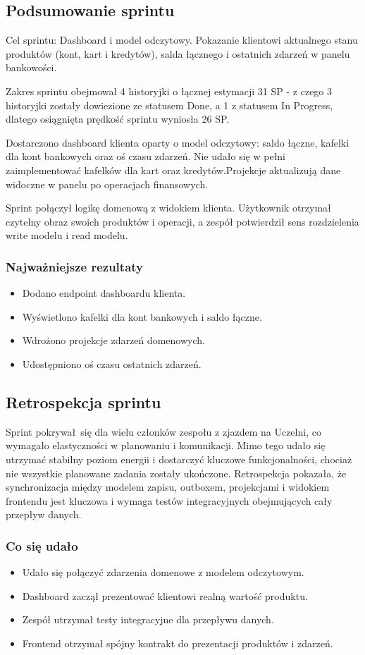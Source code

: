 \documentclass[12pt,a4paper]{article}
\begin{document}
\subsection*{Podsumowanie sprintu}
Cel sprintu: Dashboard i model odczytowy. Pokazanie klientowi aktualnego stanu produktów (kont, kart i kredytów), salda łącznego i ostatnich zdarzeń w panelu bankowości.

Zakres sprintu obejmował 4 historyjki o łącznej estymacji 31 SP - z czego 3 historyjki zostały dowiezione ze statusem Done, a 1 z statusem In Progress, dlatego osiągnięta prędkość sprintu wyniosła 26 SP.

Dostarczono dashboard klienta oparty o model odczytowy: saldo łączne, kafelki dla kont bankowych oraz oś czasu zdarzeń. Nie udało się w pełni zaimplementować kafelków dla kart oraz kredytów.Projekcje aktualizują dane widoczne w panelu po operacjach finansowych.

Sprint połączył logikę domenową z widokiem klienta. Użytkownik otrzymał czytelny obraz swoich produktów i operacji, a zespół potwierdził sens rozdzielenia write modelu i read modelu.

\subsubsection*{Najważniejsze rezultaty}
\begin{itemize}
\item Dodano endpoint dashboardu klienta.
\item Wyświetlono kafelki dla kont bankowych i saldo łączne.
\item Wdrożono projekcje zdarzeń domenowych.
\item Udostępniono oś czasu ostatnich zdarzeń.
\end{itemize}

\subsection*{Retrospekcja sprintu}
Sprint pokrywał się dla wielu członków zespołu z zjazdem na Uczelni, co wymagało elastyczności w planowaniu i komunikacji. Mimo tego udało się utrzymać stabilny poziom energii i dostarczyć kluczowe funkcjonalności, chociaż nie wszystkie planowane zadania zostały ukończone. Retrospekcja pokazała, że synchronizacja między modelem zapisu, outboxem, projekcjami i widokiem frontendu jest kluczowa i wymaga testów integracyjnych obejmujących cały przepływ danych.

\subsubsection*{Co się udało}
\begin{itemize}
\item Udało się połączyć zdarzenia domenowe z modelem odczytowym.
\item Dashboard zaczął prezentować klientowi realną wartość produktu.
\item Zespół utrzymał testy integracyjne dla przepływu danych.
\item Frontend otrzymał spójny kontrakt do prezentacji produktów i zdarzeń.
\end{itemize}
\end{document}
